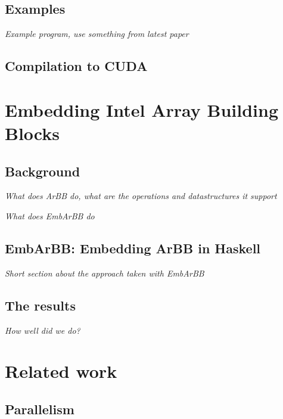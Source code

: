 \documentclass[a4paper]{book}
\begin{document}
\subsection{Examples} 
\noindent\emph{Example program, use something from latest paper} 


\subsection{Compilation to CUDA}


\section{Embedding Intel Array Building Blocks} 

\subsection{Background} 
\noindent\emph{What does ArBB do, what are the operations and datastructures it support} 

\noindent\emph{What does EmbArBB do} 


\subsection{EmbArBB: Embedding ArBB in Haskell}
\label{sec:EmbArBB} 

\noindent\emph{Short section about the approach taken with EmbArBB}


\subsection{The results} 

\emph{ How well did we do?} 


\section{Related work} 

\subsection{Parallelism} 
\end{document}
